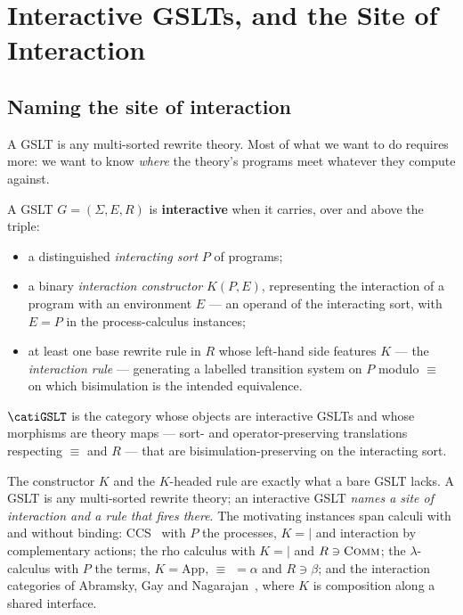 \chapter{Interactive GSLTs, and the Site of Interaction}
\label{ch:igslt}

\section{Naming the site of interaction}

A GSLT is any multi-sorted rewrite theory. Most of what we want to do requires more:
we want to know \emph{where} the theory's programs meet whatever they compute against.

\begin{definition}
\label{ob:def:igslt}
A GSLT $G = (\Sigma,E,R)$ is \textbf{interactive} when it carries, over and above the
triple:
\begin{itemize}[leftmargin=2em]
  \item a distinguished \emph{interacting sort} $P$ of programs;
  \item a binary \emph{interaction constructor} $K(P,E)$, representing the interaction
    of a program with an environment $E$ --- an operand of the interacting sort, with
    $E = P$ in the process-calculus instances;
  \item at least one base rewrite rule in $R$ whose left-hand side features $K$ --- the
    \emph{interaction rule} --- generating a labelled transition system on $P$ modulo
    $\equiv$ on which bisimulation is the intended equivalence.
\end{itemize}
\end{definition}

\begin{definition}
$\catiGSLT$ is the category whose objects are interactive GSLTs and whose morphisms are
theory maps --- sort- and operator-preserving translations respecting $\equiv$ and $R$
--- that are bisimulation-preserving on the interacting sort.
\end{definition}

The constructor $K$ and the $K$-headed rule are exactly what a bare GSLT lacks. A GSLT
is any multi-sorted rewrite theory; an interactive GSLT \emph{names a site of
interaction and a rule that fires there}. The motivating instances span calculi with and
without binding: CCS~\cite{milnerCC} with $P$ the processes, $K = {\mid}$ and
interaction by complementary actions; the rho calculus with $K = {\mid}$ and $R \ni
\textsc{Comm}$; the $\lambda$-calculus with $P$ the terms, $K = \mathrm{App}$, $\equiv$
$= \alpha$ and $R \ni \beta$; and the interaction categories of Abramsky, Gay and
Nagarajan~\cite{AbramskyGayNagarajan1996}, where $K$ is composition along a shared
interface.

